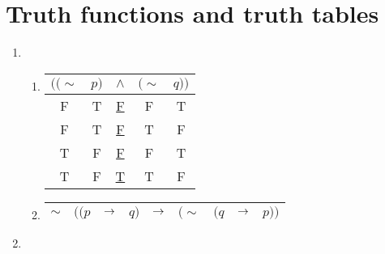 \section{Truth functions and truth tables}

\solutions{}

\begin{enumerate}
  \item %
    \begin{enumerate}[(\alph*)]
      \item 
        \begin{tabular}{ccccc}
          \(((\sim\)&
          \(p)\)&
          \(\wedge\)&
          \((\sim\)&
          \(q))\)\\\hline

          F&
          T&
          \underline{F}&
          F&
          T\\

          F&
          T&
          \underline{F}&
          T&
          F\\

          T&
          F&
          \underline{F}&
          F&
          T\\

          T&
          F&
          \underline{T}&
          T&
          F
        \end{tabular}

        \item
          \begin{tabular}{ccccccccc}
            \(\sim\)&
            \(((p\)&
            \(\rightarrow\)&
            \(q)\)&
            \(\rightarrow\)&
            \((\sim\)&
            \((q\)&
            \(\rightarrow\)&
            \(p))\)\\\hline
          \end{tabular}
    \end{enumerate}

  \item %
\end{enumerate}
